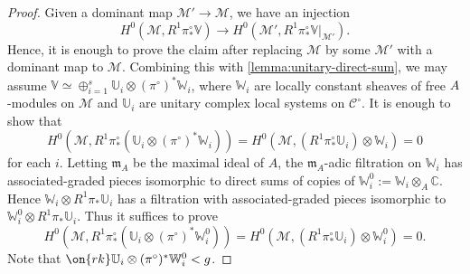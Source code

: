 \documentclass[12 pt]{amsart}
\theoremstyle{plain}
\theoremstyle{definition}
\theoremstyle{remark}
\numberwithin{equation}{section}
\begin{document}
\begin{proof}
	Given a dominant map $\mathscr M' \to \mathscr M$,
	we have an injection $$H^0(\mathscr M, R^1 \pi^\circ_* \mathbb
	V) \to H^0(\mathscr M', R^1 \pi^\circ_* \mathbb V|_{\mathscr M'}).$$
	Hence, it is enough to prove the claim after replacing $\mathscr M$ by
	some $\mathscr M'$ with a dominant map to  $\mathscr M$.
	Combining this with \autoref{lemma:unitary-direct-sum}, we may assume $\mathbb V \simeq \oplus_{i=1}^s \mathbb U_i
\otimes (\pi^\circ)^* \mathbb
	W_i$, where $\mathbb W_i$ are locally constant sheaves of free $A$-modules on $\mathscr M$ and
	$\mathbb U_i$ are unitary complex local systems on $\mathscr C^\circ$. 
	It is enough to show that 
	$$H^0(\mathscr{M}, R^1\pi^\circ_*(\mathbb{U}_i\otimes
	(\pi^\circ)^*\mathbb{W}_i))=H^0(\mathscr{M},
	(R^1\pi^\circ_*\mathbb{U}_i)
	\otimes \mathbb{W}_i )=0$$ for each $i$. 
	Letting $\mathfrak{m}_A$ be the maximal ideal of $A$, the $\mathfrak{m}_A$-adic filtration on $\mathbb{W}_i$ has associated-graded pieces isomorphic to direct sums of copies of $\mathbb{W}_i^0:=\mathbb{W}_i\otimes_A\mathbb{C}.$ 
	Hence $\mathbb W_i\otimes R^1\pi_*\mathbb{U}_i$ has a filtration with associated-graded pieces isomorphic to $\mathbb{W}_i^0\otimes R^1\pi_*\mathbb{U}_i$. 
	Thus it suffices to prove  $$H^0(\mathscr{M},
	R^1\pi^\circ_*(\mathbb{U}_i\otimes
	(\pi^\circ)^*\mathbb{W}^0_i))=H^0(\mathscr{M}, (R^1\pi^\circ_*\mathbb{U}_i) \otimes \mathbb W^0_i)=0.$$
	 Note that $\on{rk} \mathbb{U}_i\otimes (\pi^\circ)^*\mathbb{W}^0_i<g$.


\end{proof}
\end{document}
